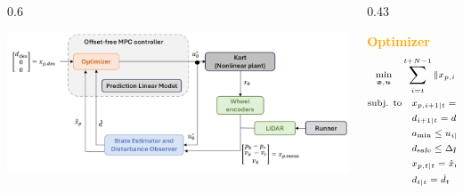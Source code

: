 \documentclass[9pt, aspectratio=169]{beamer}
\begin{document}
\begin{frame}
\begin{columns}
\begin{column}{0.6\textwidth}
	\begin{center}
  		\includegraphics[width=1.05\textwidth]{MPC_ofhard_scheme} 
	\end{center}
\end{column}
\hspace{0.2cm}
\begin{column}{0.43\textwidth}
\begin{block}{}
\centering
\textcolor{orange}{\textbf{Optimizer}} 
\begin{equation*}
\scriptsize
\begin{alignedat}{2}
	\min_{\substack{\boldsymbol{x}, \boldsymbol{u}}}\quad & \sum_{i=t}^{t+N-1} \| x_{p,i|t} - \bar{x}_t \|_Q +  \| u_{i|t} - \bar{u}_t\|_R &&  \\
	\text{subj. to} & \quad x_{p,i+1|t}  = A_p \, x_{p,i|t} + B_p \, u_{i|t} + a_t + B_d \, d_{i|t} &&  \\
    & \quad d_{i+1|t}  = d_{i|t} && \\
    &\quad a_{\text{min}} \leq u_{i|t} \leq a_{\text{max}}&& \\
    &\quad d_{\text{safe}}\leq \Delta p_{i|t} &&  \\
    &\quad x_{p,t|t} = \hat{x}_t && \\
    &\quad d_{t|t} = \hat{d}_t && 
\end{alignedat}
\end{equation*}
\end{block}
\end{column}
\end{columns}

\vspace{0.1cm}
\begin{columns}


\end{columns}
\end{frame}
\end{document}
